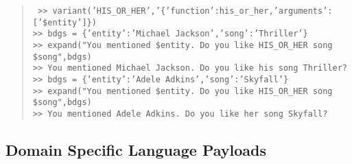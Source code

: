 \documentclass[letterpaper,12pt]{article}
\begin{document}
\begin{quotation} \tt
%
  >> variant('HIS_OR_HER','\{'function':his_or_her,'arguments':['\$entity']\})\\
  >> bdgs = \{'entity':'Michael Jackson','song':'Thriller'\}\\
  >> expand("You mentioned \$entity. Do you like HIS_OR_HER song \$song",bdgs)\\
  >> You mentioned Michael Jackson. Do you like his song Thriller?\\
  >> bdgs = \{'entity':'Adele Adkins','song':'Skyfall'\}\\
  >> expand("You mentioned \$entity. Do you like HIS_OR_HER song \$song",bdgs)\\
  >> You mentioned Adele Adkins. Do you like her song Skyfall?\\
%
\end{quotation}

\subsection*{Domain Specific Language Payloads}
\end{document}
